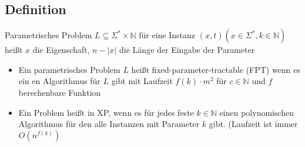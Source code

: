 \subsection{Definition}
Parametrisches Problem $L \subseteq \Sigma^* \times \mathbb{N}$ für eine Instanz $(x,t) (x \in \Sigma^*, k\in \mathbb{N} )$ heißt $x$ die Eigenschaft, $n-|x|$ die Länge der Eingabe der Parameter
\begin{itemize}
	\item Ein parametrisches Problem $L$ heißt fixed-parameter-tractable (FPT) wenn es ein en Algorithmus für $L$ gibt mit Laufzeit $f(k)\cdot m^2$ für $c\in \mathbb{N}$ und $f$ berechenbare Funktion
	\item Ein Problem heißt in XP, wenn es für jedes feste $k \in \mathbb{N}$ einen polynomischen Algorithmus für den alle Instanzen mit Parameter $k$ gibt. (Laufzeit ist immer $O(n^{f(k)})$
\end{itemize}